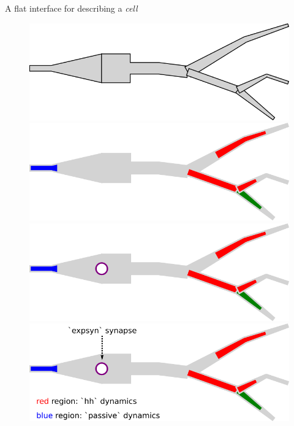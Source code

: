 \documentclass[aspectratio=43]{beamer}
\begin{document}
\begin{frame}[fragile]{A flat interface for describing a \emph{cell}}
    \begin{figure}
        \centering
            {%
                \includegraphics[height=0.2\paperheight]{images/p1.png}%
            }%
            {%
                \includegraphics[height=0.2\paperheight]{images/p2.png}%
            }%
            {%
                \includegraphics[height=0.2\paperheight]{images/p3.png}%
            }%
            {%
                \includegraphics[height=0.2\paperheight]{images/p4.png}%
}
\end{figure}
\end{frame}
\end{document}
